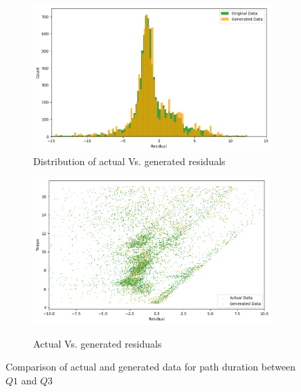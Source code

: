 \documentclass[12pt]{article}
\begin{document}
\FloatBarrier
\begin{figure}
\begin{subfigure}[h]{0.48\linewidth}
\includegraphics[width=\linewidth]{Q1_Q3 distribution actual Vs. generated.png}
    \caption{Distribution of actual Vs. generated residuals}
    \label{fig:Q1_Q3 distribution actual Vs. generated}
\end{subfigure}
\hfill
\begin{subfigure}[h]{0.48\linewidth}
\includegraphics[width=\linewidth]{Q1_Q3 actual Vs. generated.png}\\
    \caption{Actual Vs. generated residuals}
    \label{fig:Actual Vs. generated residuals (Q1 < time duration < Q3)}
\end{subfigure}%
\caption{Comparison of actual and generated data for path duration between $Q1$ and $Q3$}
\end{figure}
\FloatBarrier
\end{document}
